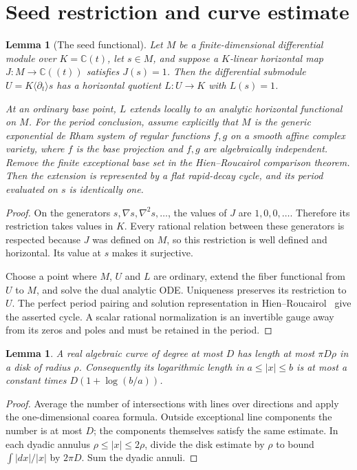 \documentclass[11pt]{article}
\newtheorem{lemma}[theorem]{Lemma}
\theoremstyle{definition}\newtheorem{definition}[theorem]{Definition}
\theoremstyle{remark}\newtheorem{remark}[theorem]{Remark}
\newcommand{\C}{\mathbb C}
\begin{document}
\section{Seed restriction and curve estimate}
\begin{lemma}[The seed functional]\label{lem:seedfunctional}
Let $M$ be a finite-dimensional differential module over $K=\C(t)$,
let $s\in M$, and suppose a $K$-linear horizontal map
$J:M\longrightarrow\C((t))$ satisfies $J(s)=1$. Then the differential
submodule $U=K\langle\partial_t\rangle s$ has a horizontal quotient
$L:U\longrightarrow K$ with $L(s)=1$.

At an ordinary base point, $L$ extends locally to an analytic horizontal
functional on $M$. For the period conclusion, assume explicitly that
$M$ is the generic exponential de Rham system of regular functions
$f,g$ on a smooth affine complex variety, where $f$ is the base
projection and $f,g$ are algebraically independent. Remove the finite
exceptional base set in the Hien--Roucairol comparison theorem.
Then the extension is represented by a flat rapid-decay cycle, and its
period evaluated on $s$ is identically one.
\end{lemma}
\begin{proof}
On the generators $s,\nabla s,\nabla^2s,\ldots$, the values of $J$
are $1,0,0,\ldots$. Therefore its restriction takes values in $K$.
Every rational relation between these generators is respected because
$J$ was defined on $M$, so this restriction is well defined and
horizontal. Its value at $s$ makes it surjective.

Choose a point where $M$, $U$ and $L$ are ordinary, extend the fiber
functional from $U$ to $M$, and solve the dual analytic ODE.
Uniqueness preserves its restriction to $U$. The perfect period
pairing and solution representation in
Hien--Roucairol~\cite[Theorems~2.4 and~3.7]{HienRoucairol} give the
asserted cycle. A scalar rational normalization is an invertible gauge
away from its zeros and poles and must be retained in the period.
\end{proof}

\begin{lemma}\label{lem:curvelength}
A real algebraic curve of degree at most $D$ has length at most
$\pi D\rho$ in a disk of radius $\rho$. Consequently its logarithmic
length in $a\leq|x|\leq b$ is at most a constant times
$D(1+\log(b/a))$.
\end{lemma}
\begin{proof}
Average the number of intersections with lines over directions and
apply the one-dimensional coarea formula. Outside exceptional line
components the number is at most $D$; the components themselves
satisfy the same estimate. In each dyadic annulus
$\rho\leq|x|\leq2\rho$, divide the disk estimate by $\rho$ to
bound $\int|dx|/|x|$ by $2\pi D$. Sum the dyadic annuli.
\end{proof}
\end{document}

